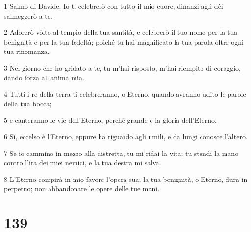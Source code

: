 \par 1 Salmo di Davide. Io ti celebrerò con tutto il mio cuore, dinanzi agli dèi salmeggerò a te.
\par 2 Adorerò vòlto al tempio della tua santità, e celebrerò il tuo nome per la tua benignità e per la tua fedeltà; poiché tu hai magnificato la tua parola oltre ogni tua rinomanza.
\par 3 Nel giorno che ho gridato a te, tu m'hai risposto, m'hai riempito di coraggio, dando forza all'anima mia.
\par 4 Tutti i re della terra ti celebreranno, o Eterno, quando avranno udito le parole della tua bocca;
\par 5 e canteranno le vie dell'Eterno, perché grande è la gloria dell'Eterno.
\par 6 Sì, eccelso è l'Eterno, eppure ha riguardo agli umili, e da lungi conosce l'altero.
\par 7 Se io cammino in mezzo alla distretta, tu mi ridai la vita; tu stendi la mano contro l'ira dei miei nemici, e la tua destra mi salva.
\par 8 L'Eterno compirà in mio favore l'opera sua; la tua benignità, o Eterno, dura in perpetuo; non abbandonare le opere delle tue mani.

\chapter{139}

